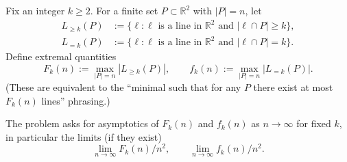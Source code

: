 Fix an integer $k\ge 2$.
For a finite set $P\subset\mathbb{R}^2$ with $|P|=n$, let
\begin{align*}
L_{\ge k}(P) &:= \{ \ell : \ell \text{ is a line in }\mathbb{R}^2 \text{ and } |\ell\cap P|\ge k\},\\
L_{=k}(P) &:= \{ \ell : \ell \text{ is a line in }\mathbb{R}^2 \text{ and } |\ell\cap P|= k\}.
\end{align*}
Define extremal quantities
\[
F_k(n) := \max_{|P|=n} |L_{\ge k}(P)|,
\qquad
f_k(n) := \max_{|P|=n} |L_{=k}(P)|.
\]
(These are equivalent to the ``minimal such that for any $P$ there exist at most $F_k(n)$ lines'' phrasing.)

The problem asks for asymptotics of $F_k(n)$ and $f_k(n)$ as $n\to\infty$ for fixed $k$, in particular the limits (if they exist)
\[\lim_{n\to\infty} F_k(n)/n^2,\qquad \lim_{n\to\infty} f_k(n)/n^2.\]
